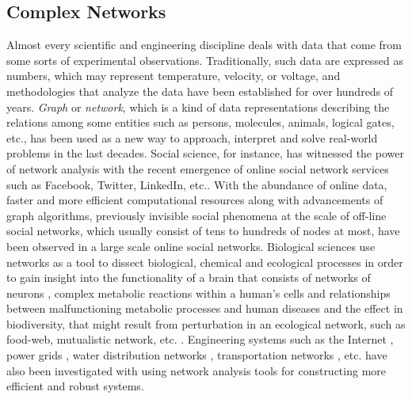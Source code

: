 \documentclass{article}
\begin{document}
	\subsection{Complex Networks}
	Almost every scientific and engineering discipline deals with data that come from some sorts of experimental observations. Traditionally, such data are expressed as numbers, which may represent temperature, velocity, or voltage, and methodologies that analyze the data have been established for over hundreds of years. \textit{Graph} or \textit{network}, which is a kind of data representations describing the relations among some entities such as persons, molecules, animals, logical gates, etc., has been used as a new way to approach, interpret and solve real-world problems in the last decades. Social science, for instance, has witnessed the power of network analysis with the recent emergence of online social network services such as Facebook, Twitter, LinkedIn, etc.\cite{Kleinberg:1}. With the abundance of online data, faster and more efficient computational resources along with advancements of graph algorithms, previously invisible social phenomena at the scale of off-line social networks, which usually consist of tens to hundreds of nodes at most, have been observed in a large scale online social networks.  Biological sciences use networks as a tool to dissect biological, chemical and ecological processes in order to gain insight into the functionality of a brain that consists of networks of neurons \cite{BrainNetwork}, complex metabolic reactions within a human's cells and relationships between malfunctioning metabolic processes and human diseases \cite{MetabolicNetworkAndDiseases} and the effect in biodiversity, that might result from perturbation in an ecological network, such as food-web, mutualistic network, etc. \cite{EcologicalNetwork}. Engineering systems such as the Internet \cite{Internet}, power grids \cite{PowerGrid}, water distribution networks \cite{WaterDistribution}, transportation networks \cite{Train}, etc. have also been investigated with using network analysis tools for constructing more efficient and robust systems. 
	
\end{document}
